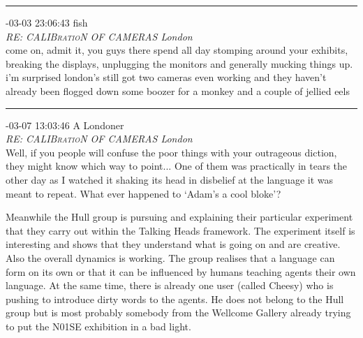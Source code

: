 \begin{mail}
\rule{0.8\textwidth}{.4pt}

{-03-03 23:06:43 fish}\\
{\itshape RE: CALIB\textsc{ratio}N OF CAMERAS London}\\
come on, admit it, you guys there spend all day stomping around your exhibits, breaking the displays, unplugging the monitors and generally mucking things up. i'm surprised london's still got two cameras even working and they haven't already been flogged down some boozer for a monkey and a couple of jellied eels\\

\rule{0.8\textwidth}{.4pt}

{-03-07 13:03:46 A Londoner}\\
{\itshape RE: CALIB\textsc{ratio}N OF CAMERAS London}\\
Well, if you people will confuse the poor things with your outrageous diction, they might know which way to point... One of them was practically in tears the other day as I watched it shaking its head in disbelief at the language it was meant to repeat. What ever happened to `Adam's a cool bloke'?
\end{mail}

Meanwhile the Hull group is pursuing and explaining their particular experiment that they carry out within the 
Talking Heads framework. The experiment itself is interesting and shows that they understand what is 
going on and are creative. Also the overall dynamics is working. The group realises that a language can form 
on its own or that it can be influenced by humans teaching agents their own language. 
At the same time, there is already one user (called Cheesy) who is pushing to introduce
dirty words to the agents. He does not belong to the Hull group but is most probably somebody from the 
Wellcome Gallery already trying to put the N01SE exhibition in a bad light.


